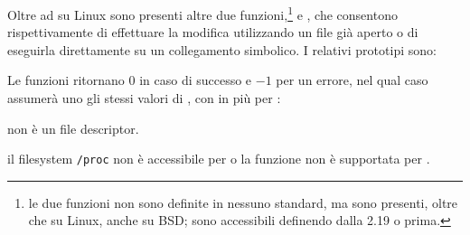 



Oltre ad  su Linux sono presenti altre due funzioni,\footnote{le
  due funzioni non sono definite in nessuno standard, ma sono presenti, oltre
  che su Linux, anche su BSD; sono accessibili definendo
   dalla  2.19 o 
  prima.}  e , che consentono rispettivamente
di effettuare la modifica utilizzando un file già aperto o di eseguirla
direttamente su un collegamento simbolico. I relativi prototipi sono:

\begin{funcproto}{
}

{Le funzioni ritornano $0$ in caso di successo e $-1$ per un errore, nel qual
  caso  assumerà uno gli stessi valori di , con in più
  per :
  \begin{errlist}
  \item[\errcode{EBADF}]  non è un file descriptor.
  \item[\errcode{ENOSYS}] il filesystem \texttt{/proc} non è accessibile per
     o la funzione non è supportata per .
  \end{errlist}}  
\end{funcproto}


